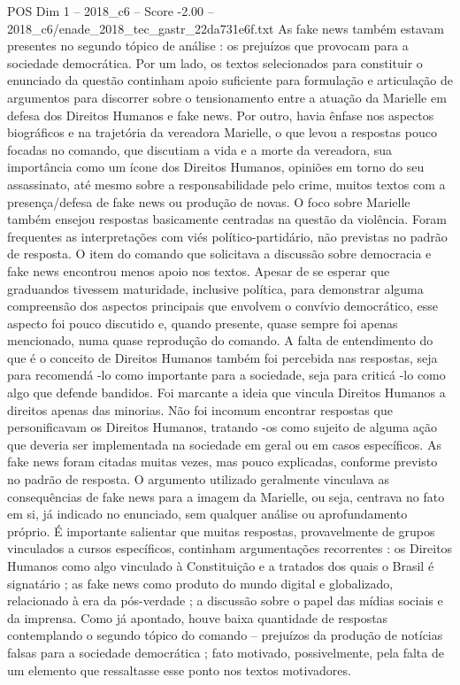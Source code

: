 \begin{textsample}{POS Dim 1 – 2018\_c6 – Score -2.00 – 2018\_c6/enade\_2018\_tec\_gastr\_22da731e6f.txt}
As fake news também estavam presentes no segundo tópico de análise : os prejuízos que provocam para a sociedade democrática.
Por um lado, os textos selecionados para constituir o enunciado da questão continham apoio suficiente para formulação e articulação de argumentos para discorrer sobre o tensionamento entre a atuação da Marielle em defesa dos Direitos Humanos e fake news.
Por outro, havia ênfase nos aspectos biográficos e na trajetória da vereadora Marielle, o que levou a respostas pouco focadas no comando, que discutiam a vida e a morte da vereadora, sua importância como um ícone dos Direitos Humanos, opiniões em torno do seu assassinato, até mesmo sobre a responsabilidade pelo crime, muitos textos com a presença/defesa de fake news ou produção de novas.
O foco sobre Marielle também ensejou respostas basicamente centradas na questão da violência.
Foram frequentes as interpretações com viés político-partidário, não previstas no padrão de resposta.
O item do comando que solicitava a discussão sobre democracia e fake news encontrou menos apoio nos textos.
Apesar de se esperar que graduandos tivessem maturidade, inclusive política, para demonstrar alguma compreensão dos aspectos principais que envolvem o convívio democrático, esse aspecto foi pouco discutido e, quando presente, quase sempre foi apenas mencionado, numa quase reprodução do comando.
A falta de entendimento do que é o conceito de Direitos Humanos também foi percebida nas respostas, seja para recomendá -lo como importante para a sociedade, seja para criticá -lo como algo que defende bandidos.
Foi marcante a ideia que vincula Direitos Humanos a direitos apenas das minorias.
Não foi incomum encontrar respostas que personificavam os Direitos Humanos, tratando -os como sujeito de alguma ação que deveria ser implementada na sociedade em geral ou em casos específicos.
As fake news foram citadas muitas vezes, mas pouco explicadas, conforme previsto no padrão de resposta.
O argumento utilizado geralmente vinculava as consequências de fake news para a imagem da Marielle, ou seja, centrava no fato em si, já indicado no enunciado, sem qualquer análise ou aprofundamento próprio.
É importante salientar que muitas respostas, provavelmente de grupos vinculados a cursos específicos, continham argumentações recorrentes : os Direitos Humanos como algo vinculado à Constituição e a tratados dos quais o Brasil é signatário ; as fake news como produto do mundo digital e globalizado, relacionado à era da pós-verdade ; a discussão sobre o papel das mídias sociais e da imprensa.
Como já apontado, houve baixa quantidade de respostas contemplando o segundo tópico do comando – prejuízos da produção de notícias falsas para a sociedade democrática ; fato motivado, possivelmente, pela falta de um elemento que ressaltasse esse ponto nos textos motivadores.

\end{textsample}
